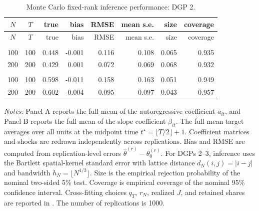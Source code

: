 \begingroup
\small
\setlength{\LTleft}{0pt plus 1fill}
\setlength{\LTright}{0pt plus 1fill}
\begin{longtable}{ccrrrrrr}
\caption{Monte Carlo fixed-rank inference performance: DGP 2.}\label{tab:mc_perf_dgp2}\\
\toprule
$N$ & $T$ & true & bias & RMSE & mean s.e. & size & coverage \\
\midrule
\endfirsthead
\toprule
$N$ & $T$ & true & bias & RMSE & mean s.e. & size & coverage \\
\midrule
\endhead
\bottomrule
\endfoot
\multicolumn{8}{l}{\textit{Panel A. Autoregressive coefficient full mean}}\\
100 & 100 & 0.448 & -0.001 & 0.116 & 0.108 & 0.065 & 0.935 \\
200 & 200 & 0.429 & 0.001 & 0.072 & 0.069 & 0.068 & 0.932 \\
\addlinespace
\multicolumn{8}{l}{\textit{Panel B. Slope coefficient full mean}}\\
100 & 100 & 0.598 & -0.011 & 0.158 & 0.163 & 0.051 & 0.949 \\
200 & 200 & 0.602 & -0.004 & 0.095 & 0.097 & 0.043 & 0.957 \\
\end{longtable}
\par\smallskip
{\footnotesize\begin{minipage}{0.92\textwidth}\textit{Notes:} Panel A reports the full mean of the autoregressive coefficient $a_{it}$, and Panel B reports the full mean of the slope coefficient $\beta_{it}$. The full mean target averages over all units at the midpoint time $t^\star=\lfloor T/2\rfloor+1$. Coefficient matrices and shocks are redrawn independently across replications. Bias and RMSE are computed from replication-level errors $\widehat\theta^{(r)}-\theta_0^{(r)}$. For DGPs 2--3, inference uses the Bartlett spatial-kernel standard error with lattice distance $d_N(i,j)=|i-j|$ and bandwidth $h_N=\lfloor N^{1/3}\rfloor$. Size is the empirical rejection probability of the nominal two-sided 5\% test. Coverage is empirical coverage of the nominal 95\% confidence interval. Cross-fitting choices $q_T$, $r_N$, realized $J$, and retained shares are reported in . The number of replications is 1000.\end{minipage}}
\endgroup
